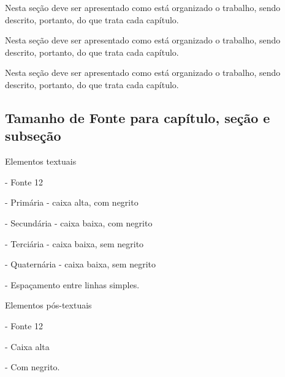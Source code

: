     Nesta seção deve ser apresentado como está organizado o trabalho, sendo descrito, portanto, do que trata cada capítulo.

Nesta seção deve ser apresentado como está organizado o trabalho, sendo descrito, portanto, do que trata cada capítulo.

Nesta seção deve ser apresentado como está organizado o trabalho, sendo descrito, portanto, do que trata cada capítulo.

\subsection{Tamanho de Fonte para capítulo, seção e subseção}

    Elementos textuais

    - Fonte 12

    - Primária - caixa alta, com negrito
    
    - Secundária - caixa baixa, com negrito
    
    - Terciária - caixa baixa, sem negrito
    
    - Quaternária - caixa baixa, sem negrito
    
    - Espaçamento entre linhas simples.

Elementos pós-textuais

    - Fonte 12
    
    - Caixa alta
    
    - Com negrito.